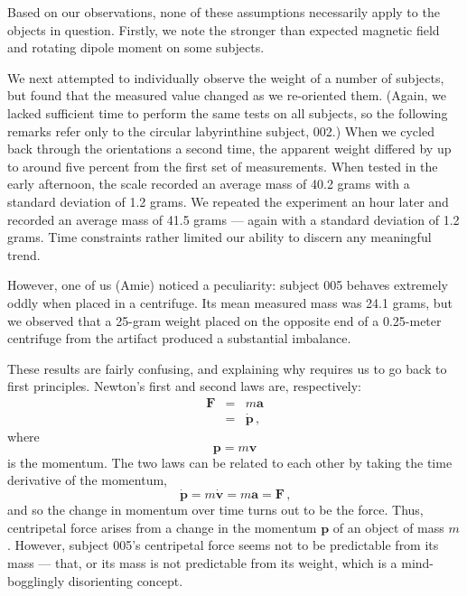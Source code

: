 \documentclass[10pt]{article}
\theoremstyle{definition}
\begin{document}
Based on our observations, none of these assumptions necessarily apply to the objects in question.
Firstly, we note the stronger than expected magnetic field and rotating dipole moment on some subjects.

We next attempted to individually observe the weight of a number of subjects, but found that the measured value changed as we re-oriented them.
(Again, we lacked sufficient time to perform the same tests on all subjects, so the following remarks refer only to the circular labyrinthine subject, 002.)
When we cycled back through the orientations a second time, the apparent weight differed by up to around five percent from the first set of measurements.
When tested in the early afternoon, the scale recorded an average mass of 40.2 grams with a standard deviation of 1.2 grams.
We repeated the experiment an hour later and recorded an average mass of 41.5 grams --- again with a standard deviation of 1.2 grams.
Time constraints rather limited our ability to discern any meaningful trend.

However, one of us (Amie) noticed a peculiarity: subject 005 behaves extremely oddly when placed in a centrifuge.
Its mean measured mass was 24.1 grams, but we observed that a 25-gram weight placed on the opposite end of a 0.25-meter centrifuge from the artifact produced a substantial imbalance.

These results are fairly confusing, and explaining why requires us to go back to first principles.
Newton's first and second laws are, respectively:
%
\begin{eqnarray}
\mathbf{F} &=& m \mathbf{a} \\
 &=& \dot{\mathbf{p}}\,\textrm{,}
\end{eqnarray}
%
where
%
\begin{equation}
\mathbf{p} = m \mathbf{v}
\end{equation}
%
is the momentum.
%
The two laws can be related to each other by taking the time derivative of the momentum,
%
\begin{equation}
\dot{\mathbf{p}} = m \dot{\mathbf{v}} = m \mathbf{a} = \mathbf{F}\,\textrm{,}
\end{equation}
%
and so the change in momentum over time turns out to be the force.
Thus, centripetal force arises from a change in the momentum $\mathbf{p}$ of an object of mass $m$.
However, subject 005's centripetal force seems not to be predictable from its mass --- that, or its mass is not predictable from its weight, which is a mind-bogglingly disorienting concept.
\end{document}
